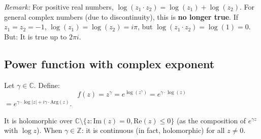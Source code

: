 \textit{Remark:} For positive real numbers, $\log(z_{1} \cdot z_{2}) = \log(z_{1}) + \log(z_{2})$.
For general complex numbers (due to discontinuity), this is \textbf{no longer true}.
If $z_{1} = z_{2} = -1$, $\log(z_{1}) = \log(z_{2}) = i\pi$, but $\log(z_{1} \cdot z_{2}) = \log(1) = 0$.
But: It is true up to $2\pi i$.

\subsection{Power function with complex exponent}

Let $\gamma \in \mathbb{C}$. Define:
$$ f(z) = z^{\gamma} = e^{\log(z^{\gamma})} = e^{\gamma \cdot \log(z)} $$
$= e^{\gamma \cdot \log|z| + i\gamma \cdot \text{Arg}(z)}$.

It is holomorphic over $\mathbb{C} \setminus \{z : \text{Im}(z) = 0, \text{Re}(z) \leq 0\}$ (as the composition of $e^{\gamma z}$ with $\log z$).
When $\gamma \in \mathbb{Z}$: it is continuous (in fact, holomorphic) for all $z \neq 0$.